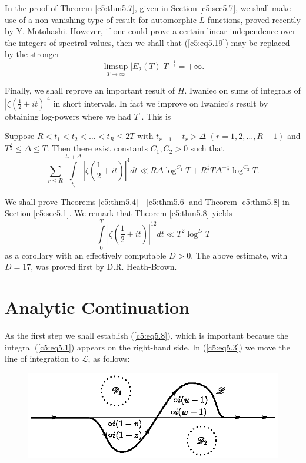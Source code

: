 In the proof of Theorem \ref{c5:thm5.7}, given in Section
\ref{c5:sec5.7}, we shall make  use of a non-vanishing type of result
for automorphic $L$-functions, proved recently by
Y. Motohashi. However, if one could prove a certain linear
independence over the integers of spectral values, then we shall that
(\ref{c5:eq5.19}) may be replaced by the stronger 
$$
\limsup\limits_{T\to \infty} |E_2 (T)| T^{-\frac{1}{2}} = + \infty.
$$

Finally, we shall reprove an important result of $H$. Iwaniec on sums
of integrals of $|\zeta \left(\frac{1}{2} + it \right)|^4$ in short
intervals. In fact we improve on Iwaniec's result by obtaining
log-powers where we had $T^\epsilon$. This is  

\begin{thm}\label{c5:thm5.8}
Suppose $R < t_1 < t_2 < \ldots < t_R \leq 2T$ with $t_{r+1} - t_r > \Delta$ $(r = 1,2,\ldots, R-1 )$ and $T^{\frac{1}{2}} \leq \Delta \leq T$. Then there exist constants $C_1, C_2 >0$ such that 
$$
\sum\limits_{r\leq R} \int\limits^{t_r+\Delta}_{t_r} \left|\zeta \left(\frac{1}{2} + it \right)\right|^4 dt \ll R \Delta \log^{C_1} T + R^{\frac{1}{2}} T \Delta^{-\frac{1}{2}} \log^{C_2} T. 
$$
\end{thm}

We shall prove Theorems \ref{c5:thm5.4} - \ref{c5:thm5.6} and Theorem \ref{c5:thm5.8} in Section \ref{c5:sec5.1}. We remark that Theorem \ref{c5:thm5.8} yields
$$
\int\limits^T_0 \left|\zeta \left(\frac{1}{2} + it \right) \right|^{12} dt \ll T^2 \log^D T
$$\pageoriginale
as a corollary with an effectively computable $D >0$. The above estimate, with $D=17$, was proved first by D.R. Heath-Brown.

\section{Analytic Continuation}\label{c5:sec5.2}

As the first step we shall establish (\ref{c5:eq5.8}), which is important because the integral (\ref{c5:eq5.1}) appears on the right-hand side. In (\ref{c5:eq5.3}) we move the line of integration to $\mathscr{L}$, as follows:

\begin{figure}[H]
\centering
\includegraphics{figures/fig1.eps}
\end{figure}


